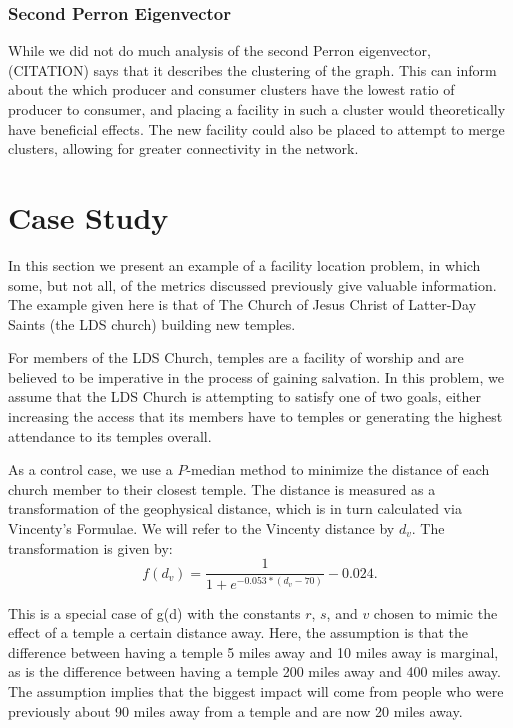 \documentclass[twoside,twocolumn]{article}
\begin{document}
\subsubsection{Second Perron Eigenvector}
While we did not do much analysis of the second Perron eigenvector, (CITATION) says that it describes the clustering of the graph.
This can inform about the which producer and consumer clusters have the lowest ratio of producer to consumer, and placing a facility in such a cluster would theoretically have beneficial effects.
The new facility could also be placed to attempt to merge clusters, allowing for greater connectivity in the network.

\section{Case Study}

In this section we present an example of a facility location problem, in which some, but not all, of the metrics discussed previously give valuable information. 
The example given here is that of The Church of Jesus Christ of Latter-Day Saints (the LDS church) building new temples.


For members of the LDS Church, temples are a facility of worship and are believed to be imperative in the process of gaining salvation.
In this problem, we assume that the LDS Church is attempting to satisfy one of two goals, either increasing the access that its members have to temples or generating the highest attendance to its temples overall.

As a control case, we use a $P$-median method to minimize the distance of each church member to their closest temple.
The distance is measured as a transformation of the geophysical distance, which is in turn calculated via Vincenty's Formulae. %
We will refer to the Vincenty distance by $d_{v}$. %
The transformation is given by:
\begin{equation}
f(d_{v}) = \frac{1}{1+e^{-0.053*(d_{v} - 70)}} - 0.024.
\end{equation}

This is a special case of g(d) with the constants $r$, $s$, and $v$ chosen to mimic the effect of a temple a certain distance away.
Here, the assumption is that the difference between having a temple 5 miles away and 10 miles away is marginal, as is the difference between having a temple 200 miles away and 400 miles away.
The assumption implies that the biggest impact will come from people who were previously about 90 miles away from a temple and are now 20 miles away.
\end{document}
